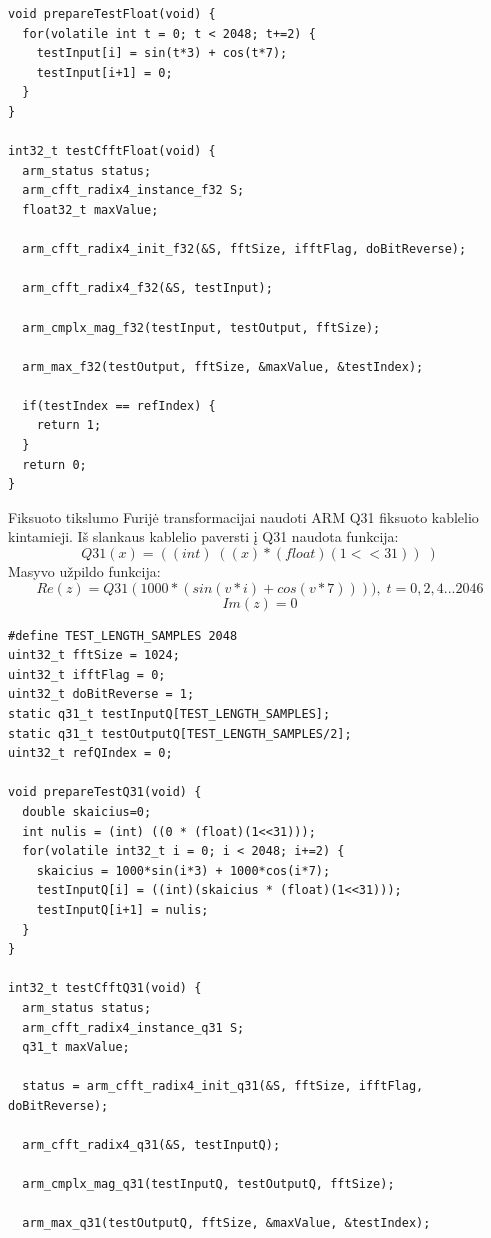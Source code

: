 \documentclass[a4paper, 12pt]{article} %
\begin{document}
\begin{onehalfspacing}
\begin{verbatim}
void prepareTestFloat(void) {
  for(volatile int t = 0; t < 2048; t+=2) {
    testInput[i] = sin(t*3) + cos(t*7);
    testInput[i+1] = 0;
  }
}

int32_t testCfftFloat(void) { 
  arm_status status; 
  arm_cfft_radix4_instance_f32 S; 
  float32_t maxValue;  
   
  arm_cfft_radix4_init_f32(&S, fftSize, ifftFlag, doBitReverse); 
   
  arm_cfft_radix4_f32(&S, testInput); 
   
  arm_cmplx_mag_f32(testInput, testOutput, fftSize);  
   
  arm_max_f32(testOutput, fftSize, &maxValue, &testIndex); 
   
  if(testIndex == refIndex) { 
    return 1;
  }
  return 0;
} 
\end{verbatim}  
Fiksuoto tikslumo Furij\.e transformacijai naudoti ARM Q31 fiksuoto kablelio kintamieji. I\v{s} slankaus kablelio paversti \k{i} Q31 naudota funkcija:
\begin{equation}
Q31(x)= ((int)\; ((x)*(float)(1<<31))\; )
\end{equation}   
Masyvo u\v{z}pildo funkcija:
\begin{equation*}
Re(z) = Q31(1000*(sin(v*i) + cos(v*7)))),\; t = 0, 2, 4... 2046
\end{equation*}
\begin{equation}
Im(z) = 0
\end{equation}
\begin{verbatim}
#define TEST_LENGTH_SAMPLES 2048
uint32_t fftSize = 1024; 
uint32_t ifftFlag = 0; 
uint32_t doBitReverse = 1; 
static q31_t testInputQ[TEST_LENGTH_SAMPLES]; 
static q31_t testOutputQ[TEST_LENGTH_SAMPLES/2]; 
uint32_t refQIndex = 0;

void prepareTestQ31(void) {
  double skaicius=0;
  int nulis = (int) ((0 * (float)(1<<31)));
  for(volatile int32_t i = 0; i < 2048; i+=2) {
    skaicius = 1000*sin(i*3) + 1000*cos(i*7);
    testInputQ[i] = ((int)(skaicius * (float)(1<<31)));
    testInputQ[i+1] = nulis;
  }
}

int32_t testCfftQ31(void) { 
  arm_status status; 
  arm_cfft_radix4_instance_q31 S; 
  q31_t maxValue; 
   
  status = arm_cfft_radix4_init_q31(&S, fftSize, ifftFlag, doBitReverse); 
   
  arm_cfft_radix4_q31(&S, testInputQ); 
  
  arm_cmplx_mag_q31(testInputQ, testOutputQ, fftSize);  
 
  arm_max_q31(testOutputQ, fftSize, &maxValue, &testIndex); 


\end{verbatim}
\end{onehalfspacing}
\end{document}

